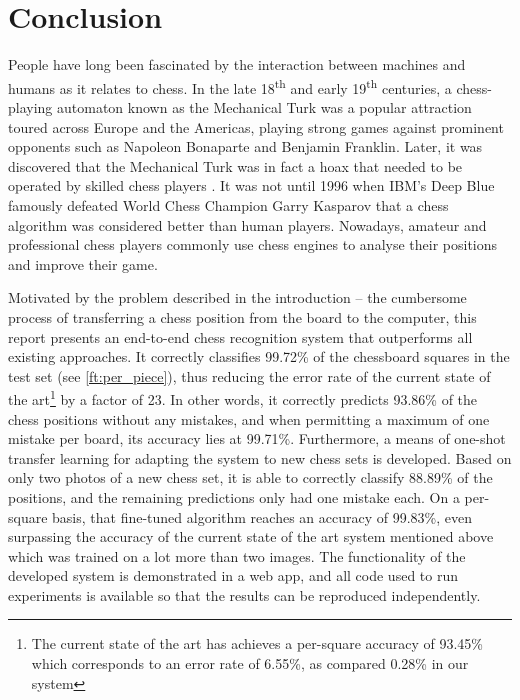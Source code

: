 \documentclass[../report.tex]{subfiles}
\begin{document}
\chapter{Conclusion}
\label{chap:conclusion}

People have long been fascinated by the interaction between machines and humans as it relates to chess.
In the late 18\textsuperscript{th} and early 19\textsuperscript{th} centuries, a chess-playing automaton known as the Mechanical Turk was a popular attraction toured across Europe and the Americas, playing strong games against prominent opponents such as Napoleon Bonaparte and Benjamin Franklin.
Later, it was discovered that the Mechanical Turk was in fact a hoax that needed to be operated by skilled chess players \cite{standage2003}.
It was not until 1996 when IBM's Deep Blue famously defeated World Chess Champion Garry Kasparov that a chess algorithm was considered better than human players.
Nowadays, amateur and professional chess players commonly use chess engines to analyse their positions and improve their game.

Motivated by the problem described in the introduction -- the cumbersome process of transferring a chess position from the board to the computer, this report presents an end-to-end chess recognition system that outperforms all existing approaches.
It correctly classifies 99.72\% of the chessboard squares in the test set (see \cref{ft:per_piece}), thus reducing the error rate of the current state of the art\footnote{The current state of the art has achieves a per-square accuracy of 93.45\% \cite{mehta2020} which corresponds to an error rate of 6.55\%, as compared 0.28\% in our system} by a factor of 23.
In other words, it correctly predicts 93.86\% of the chess positions without any mistakes, and when permitting a maximum of one mistake per board, its accuracy lies at 99.71\%.
Furthermore, a means of one-shot transfer learning for adapting the system to new chess sets is developed.
Based on only two photos of a new chess set, it is able to correctly classify 88.89\% of the positions, and the remaining predictions only had one mistake each.
On a per-square basis, that fine-tuned algorithm reaches an accuracy of 99.83\%, even surpassing the accuracy of the current state of the art system mentioned above which was trained on a lot more than two images.
The functionality of the developed system is demonstrated in a web app, and all code used to run experiments is available so that the results can be reproduced independently.
\end{document}
